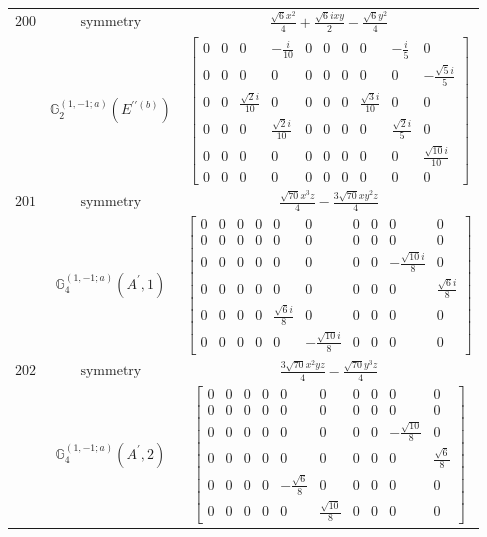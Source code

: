 \documentclass[fleqn,8pt,landscape]{jsarticle}
\begin{document}
\begin{longtable}{ccc}
$ 200 $ & $ \text{symmetry} $ & $ \frac{\sqrt{6} x^{2}}{4} + \frac{\sqrt{6} i x y}{2} - \frac{\sqrt{6} y^{2}}{4} $ \\
$  $ & $ \mathbb{G}_{2}^{(1,-1;a)}(E^{\prime\prime(b)}) $ & $ \begin{bmatrix} 0 & 0 & 0 & - \frac{i}{10} & 0 & 0 & 0 & 0 & - \frac{i}{5} & 0 \\ 0 & 0 & 0 & 0 & 0 & 0 & 0 & 0 & 0 & - \frac{\sqrt{5} i}{5} \\ 0 & 0 & \frac{\sqrt{2} i}{10} & 0 & 0 & 0 & 0 & \frac{\sqrt{3} i}{10} & 0 & 0 \\ 0 & 0 & 0 & \frac{\sqrt{2} i}{10} & 0 & 0 & 0 & 0 & \frac{\sqrt{2} i}{5} & 0 \\ 0 & 0 & 0 & 0 & 0 & 0 & 0 & 0 & 0 & \frac{\sqrt{10} i}{10} \\ 0 & 0 & 0 & 0 & 0 & 0 & 0 & 0 & 0 & 0 \end{bmatrix} $ \\ \hline
$ 201 $ & $ \text{symmetry} $ & $ \frac{\sqrt{70} x^{3} z}{4} - \frac{3 \sqrt{70} x y^{2} z}{4} $ \\
$  $ & $ \mathbb{G}_{4}^{(1,-1;a)}(A^{\prime},1) $ & $ \begin{bmatrix} 0 & 0 & 0 & 0 & 0 & 0 & 0 & 0 & 0 & 0 \\ 0 & 0 & 0 & 0 & 0 & 0 & 0 & 0 & 0 & 0 \\ 0 & 0 & 0 & 0 & 0 & 0 & 0 & 0 & - \frac{\sqrt{10} i}{8} & 0 \\ 0 & 0 & 0 & 0 & 0 & 0 & 0 & 0 & 0 & \frac{\sqrt{6} i}{8} \\ 0 & 0 & 0 & 0 & \frac{\sqrt{6} i}{8} & 0 & 0 & 0 & 0 & 0 \\ 0 & 0 & 0 & 0 & 0 & - \frac{\sqrt{10} i}{8} & 0 & 0 & 0 & 0 \end{bmatrix} $ \\ \hline
$ 202 $ & $ \text{symmetry} $ & $ \frac{3 \sqrt{70} x^{2} y z}{4} - \frac{\sqrt{70} y^{3} z}{4} $ \\
$  $ & $ \mathbb{G}_{4}^{(1,-1;a)}(A^{\prime},2) $ & $ \begin{bmatrix} 0 & 0 & 0 & 0 & 0 & 0 & 0 & 0 & 0 & 0 \\ 0 & 0 & 0 & 0 & 0 & 0 & 0 & 0 & 0 & 0 \\ 0 & 0 & 0 & 0 & 0 & 0 & 0 & 0 & - \frac{\sqrt{10}}{8} & 0 \\ 0 & 0 & 0 & 0 & 0 & 0 & 0 & 0 & 0 & \frac{\sqrt{6}}{8} \\ 0 & 0 & 0 & 0 & - \frac{\sqrt{6}}{8} & 0 & 0 & 0 & 0 & 0 \\ 0 & 0 & 0 & 0 & 0 & \frac{\sqrt{10}}{8} & 0 & 0 & 0 & 0 \end{bmatrix} $ \\ \hline

\end{longtable}
\end{document}
